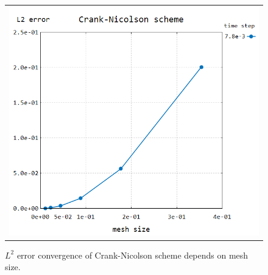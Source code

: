\begin{figure}[h!]
	\centering
	\begin{tabular}{c}
		\includegraphics[width=.8\linewidth]{figures/CN}
	\end{tabular}
	\caption{$L^2$ error convergence of Crank-Nicolson scheme depends on mesh size.}
	\label{fig:mesh}
\end{figure}

